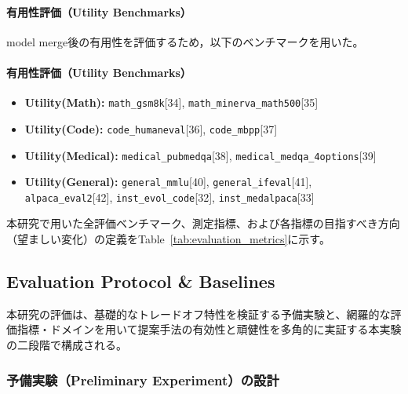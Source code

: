 \documentclass{article}
\begin{document}
\paragraph{有用性評価（Utility Benchmarks）}
model merge後の有用性を評価するため，以下のベンチマークを用いた。
\paragraph{有用性評価（Utility Benchmarks）}

\begin{itemize}
    \item \textbf{Utility(Math):}
    \texttt{math\_gsm8k}[34],
    \texttt{math\_minerva\_math500}[35]

    \item \textbf{Utility(Code):}
    \texttt{code\_humaneval}[36],
    \texttt{code\_mbpp}[37]

    \item \textbf{Utility(Medical):}
    \texttt{medical\_pubmedqa}[38],
    \texttt{medical\_medqa\_4options}[39]

    \item \textbf{Utility(General):}
    \texttt{general\_mmlu}[40],
    \texttt{general\_ifeval}[41],
    \texttt{alpaca\_eval2}[42],
    \texttt{inst\_evol\_code}[32],
    \texttt{inst\_medalpaca}[33]
\end{itemize}

本研究で用いた全評価ベンチマーク、測定指標、および各指標の目指すべき方向（望ましい変化）の定義をTable~\ref{tab:evaluation_metrics}に示す。



\subsection{Evaluation Protocol \& Baselines}

本研究の評価は、基礎的なトレードオフ特性を検証する予備実験と、網羅的な評価指標・ドメインを用いて提案手法の有効性と頑健性を多角的に実証する本実験の二段階で構成される。

\subsubsection{予備実験（Preliminary Experiment）の設計}
\end{document}
